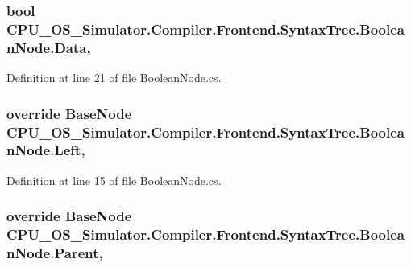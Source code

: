 \subsubsection[{Data}]{\setlength{\rightskip}{0pt plus 5cm}bool C\+P\+U\+\_\+\+O\+S\+\_\+\+Simulator.\+Compiler.\+Frontend.\+Syntax\+Tree.\+Boolean\+Node.\+Data\hspace{0.3cm}{\ttfamily [get]}, {\ttfamily [set]}}\label{class_c_p_u___o_s___simulator_1_1_compiler_1_1_frontend_1_1_syntax_tree_1_1_boolean_node_afadc08292a2dda4d7a1b536ccd8e241b}


Definition at line 21 of file Boolean\+Node.\+cs.

\hypertarget{class_c_p_u___o_s___simulator_1_1_compiler_1_1_frontend_1_1_syntax_tree_1_1_boolean_node_ac9bf4631f502393c3a0b11c82f445577}{}
\subsubsection[{Left}]{\setlength{\rightskip}{0pt plus 5cm}override {\bf Base\+Node} C\+P\+U\+\_\+\+O\+S\+\_\+\+Simulator.\+Compiler.\+Frontend.\+Syntax\+Tree.\+Boolean\+Node.\+Left\hspace{0.3cm}{\ttfamily [get]}, {\ttfamily [set]}}\label{class_c_p_u___o_s___simulator_1_1_compiler_1_1_frontend_1_1_syntax_tree_1_1_boolean_node_ac9bf4631f502393c3a0b11c82f445577}


Definition at line 15 of file Boolean\+Node.\+cs.

\hypertarget{class_c_p_u___o_s___simulator_1_1_compiler_1_1_frontend_1_1_syntax_tree_1_1_boolean_node_ae4d9aaf39a383a5febd8b60400ad6cf5}{}
\subsubsection[{Parent}]{\setlength{\rightskip}{0pt plus 5cm}override {\bf Base\+Node} C\+P\+U\+\_\+\+O\+S\+\_\+\+Simulator.\+Compiler.\+Frontend.\+Syntax\+Tree.\+Boolean\+Node.\+Parent\hspace{0.3cm}{\ttfamily [get]}, {\ttfamily [set]}}\label{class_c_p_u___o_s___simulator_1_1_compiler_1_1_frontend_1_1_syntax_tree_1_1_boolean_node_ae4d9aaf39a383a5febd8b60400ad6cf5}


